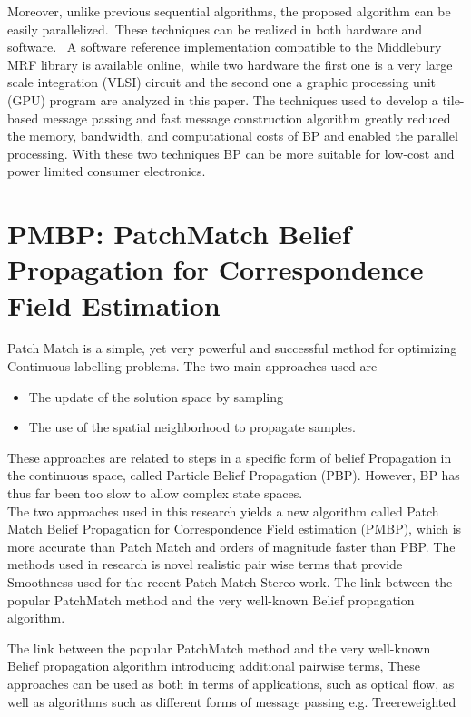 Moreover, unlike previous sequential algorithms, the proposed algorithm can be easily parallelized.\
These techniques can be realized in both hardware and software. \ A software reference implementation compatible to  the  Middlebury  MRF  library  is  available  online,\ while two hardware the first one is a very large scale integration (VLSI) circuit and the second one a graphic processing unit (GPU) program are analyzed in this paper.
The techniques used to develop a tile-based message passing and fast message construction  algorithm greatly reduced the memory, bandwidth, and computational costs of BP and enabled the parallel processing. With these two techniques  BP  can be  more suitable for low-cost and power limited consumer electronics.

\section{PMBP: PatchMatch Belief Propagation for Correspondence Field Estimation}
Patch Match is a simple, yet very powerful and successful method for optimizing Continuous labelling problems.
The two main approaches  used are
\begin{itemize}
  \item The update of the solution space by sampling
  \item The use of the spatial neighborhood to propagate samples.
\end{itemize}
These approaches are related to steps in a specific form of belief Propagation in the continuous space, called Particle Belief Propagation (PBP). However, BP has thus far been too slow to allow complex state spaces.\\The two approaches used in this research yields a new algorithm called
Patch Match Belief Propagation for Correspondence Field estimation (PMBP), which is more accurate than Patch Match and orders of magnitude faster than PBP.
The methods used in research is novel realistic pair wise terms that provide Smoothness used for the recent Patch Match Stereo work.
The link between the popular PatchMatch method and the very well-known Belief propagation algorithm.

The link between the popular PatchMatch method and the very well-known Belief propagation algorithm  introducing additional pairwise terms, These approaches  can be  used as both in terms of applications, such as optical flow, as well as algorithms such as different forms of message passing e.g.  Treereweighted


